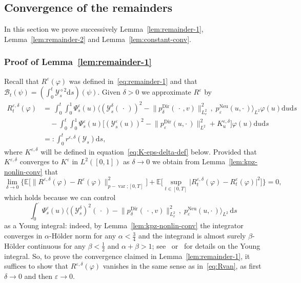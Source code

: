 \documentclass[10pt]{amsart}
\theoremstyle{definition}\newtheorem{defi}[theo]{Definition}\newtheorem{rema}[theo]{Remark}\newtheorem{exam}[theo]{Example}\newtheorem{exem}[theo]{Example}\newtheorem{nota}[theo]{Notation}
\DeclareMathOperator{\Dir}{Dir}
\DeclareMathOperator{\Neu}{Neu}
\DeclareMathOperator{\var}{var}
\newcommand{\mc}[1]{{\mathcal #1}}
\renewcommand{\mc}[1]{{\mathcal #1}}
\newcommand*{\dd}{\mathrm{d}}
\newcommand*{\ds}{\dd s}
\newcommand*{\du}{\dd u}
\begin{document}
\subsection{Convergence of the remainders}

In this section we prove successively Lemma~\ref{lem:remainder-1}, Lemma~\ref{lem:remainder-2} and Lemma~\ref{lem:constant-conv}.

\subsubsection{Proof of Lemma~\ref{lem:remainder-1}}

Recall that $R^\varepsilon(\varphi)$ was defined in~\eqref{eq:remainder-1} and that $\mc B_t(\psi)=(\int_0^t \mc Y_s^{\diamond 2} \ds)(\psi)$. Given $\delta > 0$ we approximate $R^{\varepsilon}$ by
\begin{align}\label{eq:r-eps-del-def}
\nonumber
R^{\varepsilon, \delta}_t (\varphi) & = \, \int_0^t \int_0^1
\Psi^{\varepsilon}_s (u) \Big\langle (\mc Y^{\delta}_s({\,\cdot\,}))^2 -\big\|p^{\Dir}_{\delta} (\,\cdot\,, v)
\big\|_{L^2_v}^2 \,,\; p^{\Neu}_{\varepsilon} (u, \cdot\,)\Big\rangle_{L^2} \varphi (u) \du \ds\\ \nonumber &\quad - \int_0^t \int_0^1 \Psi^{\varepsilon}_s (u) \Big[(\mc Y^{\varepsilon}_s (u))^2 -\big\|p^{\Dir}_{\varepsilon} (u, \cdot\,) \big\|_{L^2}^2 + K^{\varepsilon, \delta}_u \Big]
\varphi (u) \du \ds \\
& =: \int_0^t r^{\varepsilon,\delta}(\mc Y_s) \ds,
\end{align}
where $K^{\varepsilon, \delta}$ will be defined in equation~\eqref{eq:K-eps-delta-def} below. Provided that $K^{\varepsilon,\delta}$ converges to $K^{\varepsilon}$ in $L^2([0, 1])$ as $\delta \rightarrow 0$ we obtain from Lemma~\ref{lem:kpz-nonlin-conv} that
\[
\lim_{\delta \rightarrow 0} \Big\{ \mathbb{E} \Big[\big\| R^{\varepsilon, \delta} (\varphi) - R^{\varepsilon} (\varphi) \big\|_{p - \var ; [0, T]}^2\Big] +\mathbb{E} \Big[\sup_{t \in [0,T]} \big| R^{\varepsilon, \delta}_t (\varphi) - R^{\varepsilon}_t (\varphi) \big|^2\Big] \Big\} = 0,
\]
which holds because we can control
\[
\int_0^\cdot
\Psi^{\varepsilon}_s (u) \Big\langle (\mc Y^{\delta}_s)^2({\,\cdot\,}) -\big\|p^{\Dir}_{\delta} (\,\cdot\,, v)
\big\|_{L^2_v}^2 \,,\; p^{\Neu}_{\varepsilon} (u, \cdot\,)\Big\rangle_{L^2}\,\ds
\]
as a Young integral: indeed, by Lemma~\ref{lem:kpz-nonlin-conv} the integrator converges in $\alpha$-H\"older norm for any $\alpha < \frac34$ and the integrand is almost surely $\beta$-H\"older continuous for any $\beta < \frac12$ and $\alpha + \beta > 1$; see~\cite{Young1936} or~\cite[Section~1.3]{Lyons2007} for details on the Young integral. So, to prove the convergence claimed in Lemma~\ref{lem:remainder-1}, it suffices to show that $R^{\varepsilon, \delta} (\varphi)$ vanishes in the same sense as in~\eqref{eq:Rvan}, as first $\delta \rightarrow 0$ and then $\varepsilon \rightarrow 0$.
\end{document}
